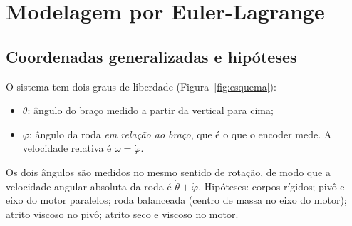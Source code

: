 \documentclass[11pt,a4paper]{article}
\begin{document}
\section{Modelagem por Euler-Lagrange}
\label{sec:lagrange}

\subsection{Coordenadas generalizadas e hipóteses}

O sistema tem dois graus de liberdade (Figura~\ref{fig:esquema}):
\begin{itemize}
  \item $\theta$: ângulo do braço medido a partir da vertical para cima;
  \item $\varphi$: ângulo da roda \emph{em relação ao braço}, que é o que o encoder mede.
        A velocidade relativa é $\omega = \dot\varphi$.
\end{itemize}
Os dois ângulos são medidos no mesmo sentido de rotação, de modo que a velocidade
angular absoluta da roda é $\dot\theta + \dot\varphi$. Hipóteses: corpos rígidos;
pivô e eixo do motor paralelos; roda balanceada (centro de massa no eixo do motor);
atrito viscoso no pivô; atrito seco e viscoso no motor.
\end{document}
